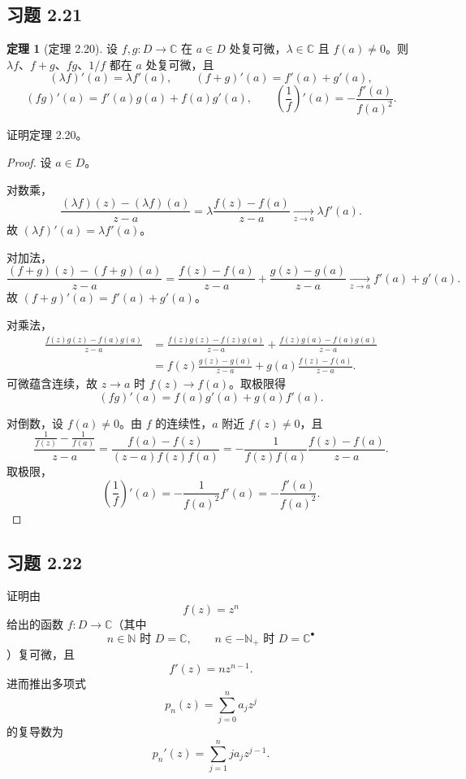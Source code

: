 \documentclass[11pt,a4paper]{article}
\newcommand{\C}{\mathbb{C}}
\newcommand{\N}{\mathbb{N}}
\theoremstyle{definition}
\newtheorem{theorem}{定理}[section]
\begin{document}
\subsection{习题 2.21}

\begin{theorem}[定理 2.20]
  设 $f,g : D \to \C$ 在 $a \in D$ 处复可微，$\lambda \in \C$ 且 $f(a) \ne 0$。则 $\lambda f$、$f+g$、$fg$、$1/f$ 都在 $a$ 处复可微，且
  \[
    (\lambda f)'(a) = \lambda f'(a),
    \qquad
    (f+g)'(a) = f'(a) + g'(a),
  \]
  \[
    (fg)'(a) = f'(a)g(a) + f(a)g'(a),
    \qquad
    \left(\frac{1}{f}\right)'(a) = -\frac{f'(a)}{f(a)^2}.
  \]
\end{theorem}

证明定理 2.20。

\begin{proof}
设 $a\in D$。

对数乘，
\[
  \frac{(\lambda f)(z)-(\lambda f)(a)}{z-a}
  = \lambda\frac{f(z)-f(a)}{z-a}
  \xrightarrow[z\to a]{} \lambda f'(a).
\]
故 $(\lambda f)'(a)=\lambda f'(a)$。

对加法，
\[
  \frac{(f+g)(z)-(f+g)(a)}{z-a}
  = \frac{f(z)-f(a)}{z-a} + \frac{g(z)-g(a)}{z-a}
  \xrightarrow[z\to a]{} f'(a)+g'(a).
\]
故 $(f+g)'(a)=f'(a)+g'(a)$。

对乘法，
\[
  \begin{aligned}
    \frac{f(z)g(z)-f(a)g(a)}{z-a}
    &= \frac{f(z)g(z)-f(z)g(a)}{z-a}
    + \frac{f(z)g(a)-f(a)g(a)}{z-a} \\
    &= f(z)\frac{g(z)-g(a)}{z-a}
    + g(a)\frac{f(z)-f(a)}{z-a}.
  \end{aligned}
\]
可微蕴含连续，故 $z\to a$ 时 $f(z)\to f(a)$。取极限得
\[
  (fg)'(a)=f(a)g'(a)+g(a)f'(a).
\]

对倒数，设 $f(a)\neq 0$。由 $f$ 的连续性，$a$ 附近 $f(z)\neq 0$，且
\[
  \frac{\frac1{f(z)}-\frac1{f(a)}}{z-a}
  = \frac{f(a)-f(z)}{(z-a)f(z)f(a)}
  = -\frac{1}{f(z)f(a)}\frac{f(z)-f(a)}{z-a}.
\]
取极限，
\[
  \left(\frac1f\right)'(a)
  = -\frac{1}{f(a)^2}f'(a)
  = -\frac{f'(a)}{f(a)^2}.
\]
\end{proof}

\subsection{习题 2.22}

证明由
\[
  f(z) = z^n
\]
给出的函数 $f : D \to \C$（其中
\[
  n \in \N \text{ 时 } D = \C,
  \qquad
  n \in -\N_+ \text{ 时 } D = \C^\bullet
\]
）复可微，且
\[
  f'(z)=n z^{n-1}.
\]
进而推出多项式
\[
  p_n(z)=\sum_{j=0}^{n} a_j z^j
\]
的复导数为
\[
  p_n'(z)=\sum_{j=1}^{n} j a_j z^{j-1}.
\]
\end{document}

